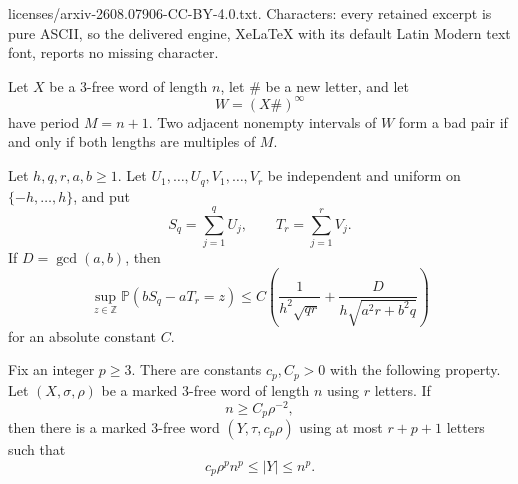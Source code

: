 \documentclass[10pt,a4paper]{amsart}
\newcommand{\Prob}{\mathbb P}
\newcommand{\Z}{\mathbb Z}
\begin{document}
licenses/arxiv-2608.07906-CC-BY-4.0.txt. Characters: every retained excerpt is pure ASCII, so the delivered engine, XeLaTeX with its default Latin Modern text font, reports no missing character.
\begin{lemma}\label{lem:periodic-reduction}
Let \(X\) be a 3-free word of length \(n\), let \(\#\) be a new letter, and let
\[
        W=(X\#)^\infty
\]
have period \(M=n+1\). Two adjacent nonempty intervals of \(W\) form a bad pair if and only if both lengths are multiples of \(M\).
\end{lemma}

\begin{lemma}\label{lem:weighted-uniform-sums}
Let $h,q,r,a,b\ge1$. Let $U_1,\ldots,U_q,V_1,\ldots,V_r$ be independent and uniform on $\{-h,\ldots,h\}$, and put
\[
        S_q=\sum_{j=1}^qU_j,
        \qquad
        T_r=\sum_{j=1}^rV_j.
\]
If $D=\gcd(a,b)$, then
\begin{equation}\label{eq:weighted-uniform-sums}
 \sup_{z\in\Z}\Prob(bS_q-aT_r=z)
 \le C\left(
        \frac{1}{h^2\sqrt{qr}}
        +\frac{D}{h\sqrt{a^2r+b^2q}}
 \right)
\end{equation}
for an absolute constant $C$.
\end{lemma}

\begin{proposition}[Amplification]\label{prop:amplification}
Fix an integer $p\ge3$. There are constants $c_p,C_p>0$ with the following property. Let $(X,\sigma,\rho)$ be a marked 3-free word of length $n$ using \(r\) letters. If
\begin{equation}\label{eq:amplifier-size-hypothesis}
        n\ge C_p\rho^{-2},
\end{equation}
then there is a marked 3-free word \((Y,\tau,c_p\rho)\) using at most \(r+p+1\) letters such that
\begin{equation}\label{eq:amplifier-conclusion}
        c_p\rho^p n^p\le |Y|\le n^p.
\end{equation}
\end{proposition}
\end{document}
